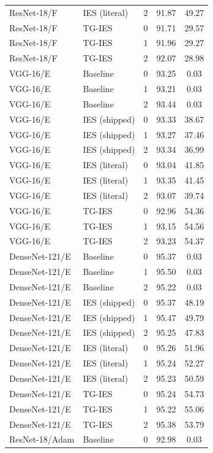 \documentclass{article}
\newcommand{\win}[1]{\cellcolor{tgwin}#1}
\newcommand{\lose}[1]{\cellcolor{tglose}#1}
\theoremstyle{plain}
\theoremstyle{definition}
\theoremstyle{remark}
\begin{document}
\begin{longtable}{llccc}
ResNet-18/F & IES (literal) & 2 & 91.87 & 49.27 \\
ResNet-18/F & TG-IES & 0 & \lose{91.71} & \lose{29.57} \\
ResNet-18/F & TG-IES & 1 & \lose{91.96} & \lose{29.27} \\
ResNet-18/F & TG-IES & 2 & \lose{92.07} & \lose{28.98} \\
VGG-16/E & Baseline & 0 & 93.25 & 0.03 \\
VGG-16/E & Baseline & 1 & 93.21 & 0.03 \\
VGG-16/E & Baseline & 2 & 93.44 & 0.03 \\
VGG-16/E & IES (shipped) & 0 & 93.33 & 38.67 \\
VGG-16/E & IES (shipped) & 1 & 93.27 & 37.46 \\
VGG-16/E & IES (shipped) & 2 & 93.34 & 36.99 \\
VGG-16/E & IES (literal) & 0 & 93.04 & 41.85 \\
VGG-16/E & IES (literal) & 1 & 93.35 & 41.45 \\
VGG-16/E & IES (literal) & 2 & 93.07 & 39.74 \\
VGG-16/E & TG-IES & 0 & \lose{92.96} & \win{54.36} \\
VGG-16/E & TG-IES & 1 & \lose{93.15} & \win{54.56} \\
VGG-16/E & TG-IES & 2 & \lose{93.23} & \win{54.37} \\
DenseNet-121/E & Baseline & 0 & 95.37 & 0.03 \\
DenseNet-121/E & Baseline & 1 & 95.50 & 0.03 \\
DenseNet-121/E & Baseline & 2 & 95.22 & 0.03 \\
DenseNet-121/E & IES (shipped) & 0 & 95.37 & 48.19 \\
DenseNet-121/E & IES (shipped) & 1 & 95.47 & 49.79 \\
DenseNet-121/E & IES (shipped) & 2 & 95.25 & 47.83 \\
DenseNet-121/E & IES (literal) & 0 & 95.26 & 51.96 \\
DenseNet-121/E & IES (literal) & 1 & 95.24 & 52.27 \\
DenseNet-121/E & IES (literal) & 2 & 95.23 & 50.59 \\
DenseNet-121/E & TG-IES & 0 & \lose{95.24} & \win{54.73} \\
DenseNet-121/E & TG-IES & 1 & \lose{95.22} & \win{55.06} \\
DenseNet-121/E & TG-IES & 2 & \win{95.38} & \win{53.79} \\
ResNet-18/Adam & Baseline & 0 & 92.98 & 0.03 \\

\end{longtable}
\end{document}

